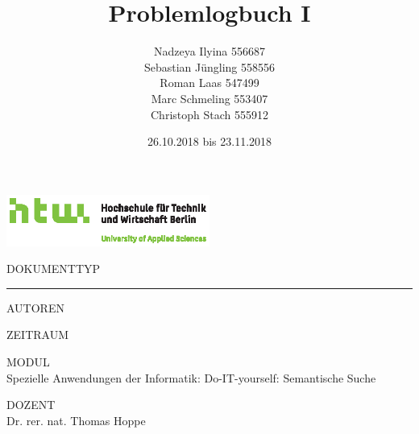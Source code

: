 \documentclass[chapterprefix=false, 12pt, a4paper, oneside, parskip=half, listof=totoc, bibliography=totoc, numbers=noendperiod]{scrbook}
\title{Problemlogbuch I}
\author{Nadzeya Ilyina 556687\\
Sebastian Jüngling 558556\\
Roman Laas 547499\\
Marc Schmeling 553407\\
Christoph Stach 555912}
\date{26.10.2018 bis 23.11.2018}
\begin{document}
    \begin{titlepage}
        \includegraphics[width=0.50\textwidth]{img/Q01_HTW_Berlin_Logo_quer_pos_FARBIG_CMYK.eps}

        \vspace{4.0cm}

        \begin{changemargin}{0.5cm}{0.0cm}
            \color{htwgrau}
            \normalsize
            \textsf{\noindent\MakeUppercase{Dokumenttyp}} \vspace{-20pt}\\

            \noindent\rule{\textwidth}{0.5pt}\vspace{-4pt}
            
            \color{black}
            \huge
            \textsf{\thetitle}
            \vspace{12pt}

            \color{htwgrau}
            \normalsize
            \textsf{\MakeUppercase{Autoren}}\\
            \color{black}
            \large
            \textsf{\theauthor}

            \vfill

            \color{htwgrau}
            \normalsize
            \textsf{\MakeUppercase{Zeitraum}}\\
            \color{black}
            \large
            \textsf{\thedate}

            \color{htwgrau}
            \normalsize
            \textsf{\MakeUppercase{Modul}}\\
            \color{black}
            \large
            \textsf{Spezielle Anwendungen der Informatik: Do-IT-yourself: Semantische Suche}

            \color{htwgrau}
            \normalsize
            \textsf{\MakeUppercase{Dozent}}\\
            \color{black}
            \large
            \textsf{Dr. rer. nat. Thomas Hoppe}



        \end{changemargin}
    \end{titlepage}
\end{document}
